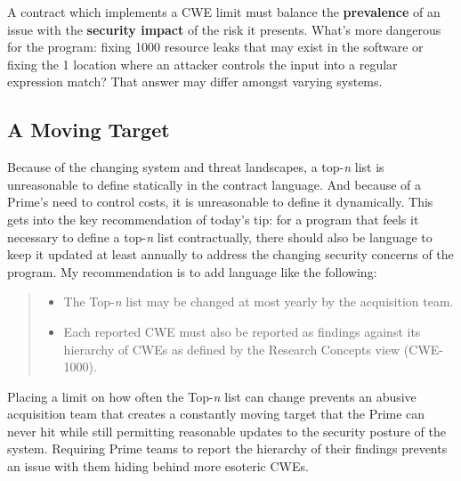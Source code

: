 A contract which implements a CWE limit must balance the \textbf{prevalence} of an issue with the \textbf{security impact} of the risk it presents. What's more dangerous for the program: fixing 1000 resource leaks that may exist in the software or fixing the 1 location where an attacker controls the input into a regular expression match? That answer may differ amongst varying systems.

\subsection{A Moving Target}
Because of the changing system and threat landscapes, a top-\textit{n} list is unreasonable to define statically in the contract language. And because of a Prime's need to control costs, it is unreasonable to define it dynamically. This gets into the key recommendation of today's tip: for a program that feels it necessary to define a top-\textit{n} list contractually, there should also be language to keep it updated at least annually to address the changing security concerns of the program. My recommendation is to add language like the following:
\begin{quote}
\begin{itemize}
	\item The Top-\textit{n} list may be changed at most yearly by the acquisition team.
	\item Each reported CWE must also be reported as findings against its hierarchy of CWEs as defined by the Research Concepts view (CWE-1000).
\end{itemize}
\end{quote}
Placing a limit on how often the Top-\textit{n} list can change prevents an abusive acquisition team that creates a constantly moving target that the Prime can never hit while still permitting reasonable updates to the security posture of the system. Requiring Prime teams to report the hierarchy of their findings prevents an issue with them hiding behind more esoteric CWEs.
